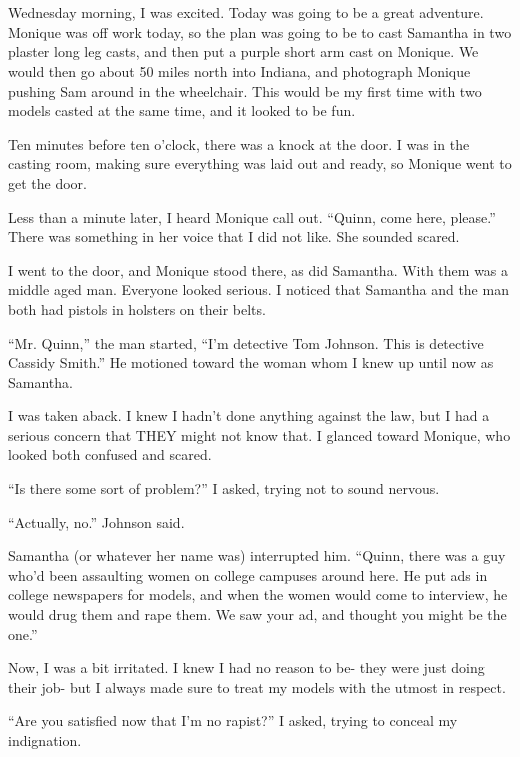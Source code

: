 \chapter{}
Wednesday morning, I was excited. Today was going to be a great adventure. Monique was off
work today, so the plan was going to be to cast Samantha in two plaster long leg casts, and then
put a purple short arm cast on Monique. We would then go about 50 miles north into Indiana, and
photograph Monique pushing Sam around in the wheelchair. This would be my first time with two
models casted at the same time, and it looked to be fun.

Ten minutes before ten o'clock, there was a knock at the door. I was in the casting room,
making sure everything was laid out and ready, so Monique went to get the door.

Less than a minute later, I heard Monique call out. ``Quinn, come here, please.'' There was
something in her voice that I did not like. She sounded scared.

I went to the door, and Monique stood there, as did Samantha. With them was a middle aged
man. Everyone looked serious. I noticed that Samantha and the man both had pistols in holsters
on their belts.

``Mr. Quinn,'' the man started, ``I'm detective Tom Johnson. This is detective Cassidy Smith.''
He motioned toward the woman whom I knew up until now as Samantha.

I was taken aback. I knew I hadn't done anything against the law, but I had a serious
concern that THEY might not know that. I glanced toward Monique, who looked both confused and
scared.

``Is there some sort of problem?'' I asked, trying not to sound nervous.

``Actually, no.'' Johnson said.

Samantha (or whatever her name was) interrupted him. ``Quinn, there was a guy who'd been
assaulting women on college campuses around here. He put ads in college newspapers for models,
and when the women would come to interview, he would drug them and rape them. We saw your ad,
and thought you might be the one.''

Now, I was a bit irritated. I knew I had no reason to be- they were just doing their job-
but I always made sure to treat my models with the utmost in respect.

``Are you satisfied now that I'm no rapist?'' I asked, trying to conceal my indignation.

